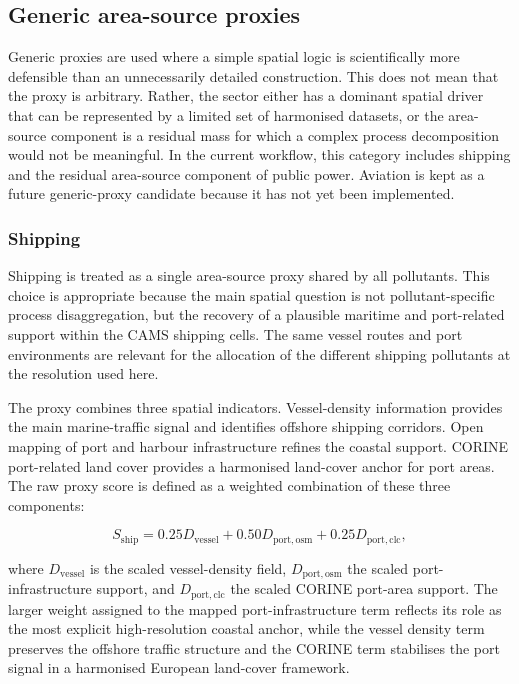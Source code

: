 \subsection{Generic area-source proxies}
\label{sec:generic-area-proxies}

Generic proxies are used where a simple spatial logic is scientifically
more defensible than an unnecessarily detailed construction. This does
not mean that the proxy is arbitrary. Rather, the sector either has a
dominant spatial driver that can be represented by a limited set of
harmonised datasets, or the area-source component is a residual mass for
which a complex process decomposition would not be meaningful. In the
current workflow, this category includes shipping and the residual
area-source component of public power. Aviation is kept as a future
generic-proxy candidate because it has not yet been implemented.

\subsubsection{Shipping}
\label{sec:generic-shipping}

Shipping is treated as a single area-source proxy shared by all
pollutants. This choice is appropriate because the main spatial question
is not pollutant-specific process disaggregation, but the recovery of a
plausible maritime and port-related support within the CAMS shipping
cells. The same vessel routes and port environments are relevant for the
allocation of the different shipping pollutants at the resolution used
here.

The proxy combines three spatial indicators. Vessel-density information
provides the main marine-traffic signal and identifies offshore shipping
corridors. Open mapping of port and harbour infrastructure refines the
coastal support. CORINE port-related land cover provides a harmonised
land-cover anchor for port areas. The raw proxy score is defined as a
weighted combination of these three components:

\begin{equation}
  S_{\mathrm{ship}} =
  0.25 D_{\mathrm{vessel}} +
  0.50 D_{\mathrm{port,osm}} +
  0.25 D_{\mathrm{port,clc}},
\end{equation}

where $D_{\mathrm{vessel}}$ is the scaled vessel-density field,
$D_{\mathrm{port,osm}}$ the scaled port-infrastructure support, and
$D_{\mathrm{port,clc}}$ the scaled CORINE port-area support. The larger
weight assigned to the mapped port-infrastructure term reflects its role
as the most explicit high-resolution coastal anchor, while the vessel
density term preserves the offshore traffic structure and the CORINE
term stabilises the port signal in a harmonised European land-cover
framework.

